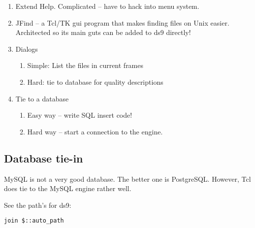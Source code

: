 \vspace{-.15cm}
\begin{enumerate}\addtolength{\itemsep}{-0.5\baselineskip}
   \item   Extend Help. Complicated -- have to hack into menu system.

   \item   JFind -- a Tcl/TK gui program that makes finding files on Unix easier.
Architected so its main guts can be added to ds9 directly!

   \item   Dialogs

\vspace{-.15cm}
\begin{enumerate}\addtolength{\itemsep}{-0.5\baselineskip}
   \item   Simple: List the files in current frames
   \item   Hard: tie to database for quality descriptions
\end{enumerate}



   \item   Tie to a database
\vspace{-.15cm}
\begin{enumerate}\addtolength{\itemsep}{-0.5\baselineskip}
   \item   Easy way -- write SQL insert code!
   \item   Hard way -- start a connection to the engine.
\end{enumerate}

\end{enumerate}



\subsection{Database tie-in}



MySQL is not a very good database. The better one is PostgreSQL.
However, Tcl does tie to the MySQL engine rather well.


See the path's for ds9:

\begingroup \fontsize{10pt}{10pt}
\selectfont
\begin{verbatim} 
join $::auto_path
\end{verbatim}
\endgroup

